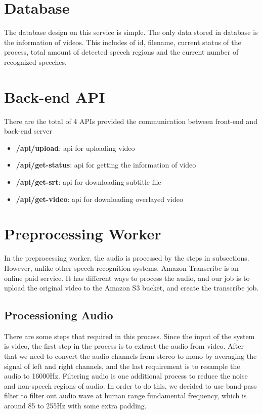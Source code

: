 \documentclass[natbib]{muthesis}
\begin{document}
 \section{Database}
 The database design on this service is simple. The only data stored in database is the information of videos. This includes of id, filename, current status of the process, total amount of detected speech regions and the current number of recognized speeches.
 
 \section{Back-end API}
 There are the total of 4 APIs provided the communication between front-end and back-end server 
 \begin{itemize}
 	\setlength\itemsep{0em}
 	\item \textbf{/api/upload}: api for uploading video
 	\item \textbf{/api/get-status}: api for getting the information of video
 	\item \textbf{/api/get-srt}: api for downloading subtitle file
 	\item \textbf{/api/get-video}: api for downloading overlayed video
 \end{itemize}
 
 
 \section{Preprocessing Worker}
 In the preprocessing worker, the audio is processed by the steps in subsections. 
 However, unlike other speech recognition systems, Amazon Transcribe is an online paid service. It has different ways to process the audio, and our job is to upload the original video to the Amazon S3 bucket, and create the transcribe job.
 
 \subsection{Processioning Audio}
 There are some steps that required in this process. Since the input of the system is video, the first step in the process is to extract the audio from video. After that we need to convert the audio channels from stereo to mono by averaging the signal of left and right channels, and the last requirement is to resample the audio to 16000Hz.
 Filtering audio is one additional process to reduce the noise and non-speech regions of audio. In order to do this, we decided to use band-pass filter to filter out audio wave at human range fundamental frequency, which is around 85 to 255Hz with some extra padding\cite{nagaraja2019voiploc}.
 
\end{document}
